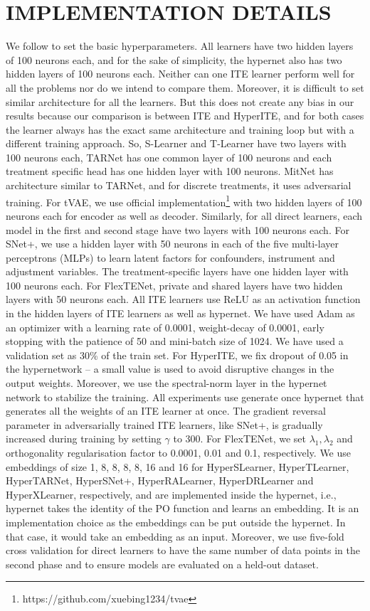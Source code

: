 \documentclass{article}
\begin{document}
\section{IMPLEMENTATION DETAILS}
\label{app_implementation}
We follow \cite{crabbe2022benchmarking} to set the basic hyperparameters. All learners have two hidden layers of 100 neurons each, and for the sake of simplicity, the hypernet also has two hidden layers of 100 neurons each. Neither can one ITE learner perform well for all the problems \cite{machlanski2023hyperparameter} nor do we intend to compare them. Moreover, it is difficult to set similar architecture for all the learners. But this does not create any bias in our results because our comparison is between ITE and HyperITE, and for both cases the learner always has the exact same architecture and training loop but with a different training approach. So, S-Learner and T-Learner have two layers with 100 neurons each, TARNet has one common layer of 100 neurons and each treatment specific head has one hidden layer with 100 neurons. MitNet has architecture similar to TARNet, and for discrete treatments, it uses adversarial training. For tVAE, we use official implementation\footnote{https://github.com/xuebing1234/tvae} with two hidden layers of 100 neurons each for encoder as well as decoder. Similarly, for all direct learners, each model in the first and second stage have two layers with 100 neurons each. For SNet+, we use a hidden layer with 50 neurons in each of the five multi-layer perceptrons (MLPs) to learn latent factors for confounders, instrument and adjustment variables. The treatment-specific layers have one hidden layer with 100 neurons each. For FlexTENet, private and shared layers have two hidden layers with 50 neurons each. All ITE learners use ReLU as an activation function in the hidden layers of ITE learners as well as hypernet. We have used Adam as an optimizer \cite{kingma2014adam} with a learning rate of 0.0001, weight-decay of 0.0001, early stopping with the patience of 50 and mini-batch size of 1024. We have used a validation set as 30\% of the train set. For HyperITE, we fix dropout of 0.05 in the hypernetwork -- a small value is used to avoid disruptive changes in the output weights. Moreover, we use the spectral-norm layer \cite{Miyato2018spectral} in the hypernet network to stabilize the training. All experiments use generate once hypernet that generates all the weights of an ITE learner at once. The gradient reversal parameter in adversarially trained ITE learners, like SNet+, is gradually increased during training by setting $\gamma$ to 300. For FlexTENet, we set $\lambda_1, \lambda_2$ and orthogonality regularisation factor to 0.0001, 0.01 and 0.1, respectively. We use embeddings of size 1, 8, 8, 8, 8, 16 and 16 for HyperSLearner, HyperTLearner, HyperTARNet, HyperSNet+, HyperRALearner, HyperDRLearner and HyperXLearner, respectively, and are implemented inside the hypernet, i.e., hypernet takes the identity of the PO function and learns an embedding. It is an implementation choice as the embeddings can be put outside the hypernet. In that case, it would take an embedding as an input. Moreover, we use five-fold cross validation for direct learners to have the same number of data points in the second phase and to ensure models are evaluated on a held-out dataset.
\end{document}

